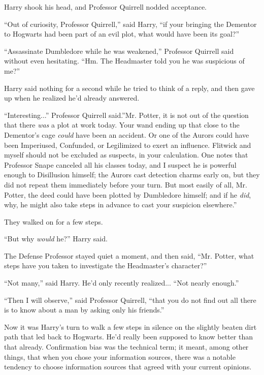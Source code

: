 Harry shook his head, and Professor Quirrell nodded acceptance.

``Out of curiosity, Professor Quirrell,'' said Harry, ``if your bringing
the Dementor to Hogwarts had been part of an evil plot, what would have
been its goal?''

``Assassinate Dumbledore while he was weakened,'' Professor Quirrell
said without even hesitating. ``Hm. The Headmaster told you he was
suspicious of me?''

Harry said nothing for a second while he tried to think of a reply, and
then gave up when he realized he'd already answered.

``Interesting...'' Professor Quirrell said.''Mr. Potter, it is not
out of the question that there \emph{was} a plot at work today. Your
wand ending up that close to the Dementor's cage \emph{could} have been
an accident. Or one of the Aurors could have been Imperiused, Confunded,
or Legilimized to exert an influence. Flitwick and myself should not be
excluded as suspects, in your calculation. One notes that Professor
Snape canceled all his classes today, and I suspect he is powerful
enough to Disillusion himself; the Aurors cast detection charms early
on, but they did not repeat them immediately before your turn. But most
easily of all, Mr. Potter, the deed could have been plotted by
Dumbledore himself; and if he \emph{did}, why, he might also take steps
in advance to cast your suspicion elsewhere.''

They walked on for a few steps.

``But why \emph{would} he?'' Harry said.

The Defense Professor stayed quiet a moment, and then said, ``Mr.
Potter, what steps have you taken to investigate the Headmaster's
character?''

``Not many,'' said Harry. He'd only recently realized... ``Not
nearly enough.''

``Then I will observe,'' said Professor Quirrell, ``that you do not find
out all there is to know about a man by asking only his friends.''

Now it was Harry's turn to walk a few steps in silence on the slightly
beaten dirt path that led back to Hogwarts. He'd really been supposed to
know better than that already. Confirmation bias was the technical term;
it meant, among other things, that when you chose your information
sources, there was a notable tendency to choose information sources that
agreed with your current opinions.


